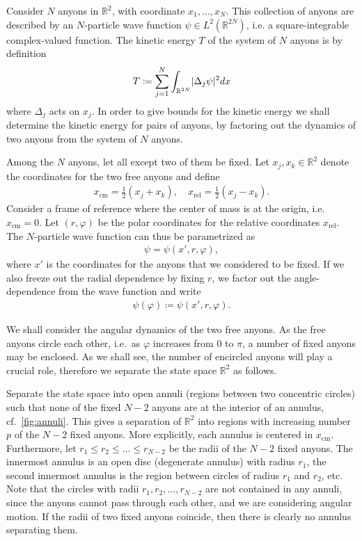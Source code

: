 \documentclass[a4paper,10pt,oneside]{book}
\theoremstyle{plain}
\theoremstyle{definition}
\theoremstyle{remark}
\DeclarePairedDelimiter\abs{\lvert}{\rvert}
\begin{document}
Consider $N$ anyons in $\mathbb{R}^2$, with coordinate $x_1, \ldots, x_N$. This collection of anyons are described by an $N$-particle wave function $\psi \in L^2(\mathbb{R}^{2N})$, i.e. a square-integrable complex-valued function. The kinetic energy $T$ of the system of $N$ anyons is by definition
\begin{align*} %
  T \coloneqq \sum_{j=1}^N \int_{\mathbb{R}^{2N}} \abs{\Delta_j \psi}^2 dx
\end{align*}
where $\Delta_j$ acts on $x_j$.
In order to give bounds for the kinetic energy we shall determine the kinetic energy for pairs of anyons, by factoring out the dynamics of two anyons from the system of $N$ anyons.

Among the $N$ anyons, let all except two of them be fixed. Let $x_j, x_k \in \mathbb{R}^2$ denote the coordinates for the two free anyons and define
\begin{align*}
  x_\text{cm} = \frac{1}{2}(x_j + x_k), \quad
  x_\text{rel} = \frac{1}{2}(x_j - x_k).
\end{align*}
Consider a frame of reference where the center of mass is at the origin, i.e.\ $x_\text{cm} = 0$. Let $(r, \varphi)$ be the polar coordinates for the relative coordinates $x_\text{rel}$. The $N$-particle wave function can thus be parametrized as
\begin{align*}
  \psi = \psi(x', r, \varphi),
\end{align*}
where $x'$ is the coordinates for the anyons that we considered to be fixed. If we also freeze out the radial dependence by fixing $r$, we factor out the angle-dependence from the wave function and write
\begin{align*}
  \psi(\varphi) \coloneqq \psi(x', r, \varphi).
\end{align*}

We shall consider the angular dynamics of the two free anyons. As the free anyons circle each other, i.e.\ as $\varphi$ increases from $0$ to $π$, a number of fixed anyons may be enclosed. As we shall see, the number of encircled anyons will play a crucial role, therefore we separate the state space $\mathbb{R}^2$ as follows.

Separate the state space into open annuli (regions between two concentric circles) such that none of the fixed $N-2$ anyons are at the interior of an annulus, cf.\ \cref{fig:annuli}. This gives a separation of $\mathbb{R}^2$ into regions with increasing number $p$ of the $N-2$ fixed anyons. More explicitly, each annulus is centered in $x_\text{cm}$. Furthermore, let $r_1 \le r_2 \le \ldots \le r_{N-2}$ be the radii of the $N-2$ fixed anyons. The innermost annulus is an open disc (degenerate annulus) with radius $r_1$, the second innermost annulus is the region between circles of radius $r_1$ and $r_2$, etc. Note that the circles with radii $r_1, r_2, \ldots, r_{N-2}$ are not contained in any annuli, since the anyons cannot pass through each other, and we are considering angular motion. If the radii of two fixed anyons coincide, then there is clearly no annulus separating them.
\end{document}
